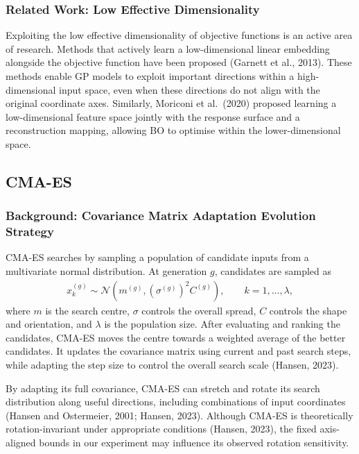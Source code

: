 \documentclass[11pt]{article}
\begin{document}
\subsubsection{Related Work: Low Effective Dimensionality}

Exploiting the low effective dimensionality of objective functions is an active area of research. Methods that actively learn a low-dimensional linear embedding alongside the objective function have been proposed (Garnett et al., 2013). These methods enable GP models to exploit important directions within a high-dimensional input space, even when these directions do not align with the original coordinate axes. Similarly, Moriconi et al.\ (2020) proposed learning a low-dimensional feature space jointly with the response surface and a reconstruction mapping, allowing BO to optimise within the lower-dimensional space.

\subsection{CMA-ES}

\subsubsection{Background: Covariance Matrix Adaptation Evolution Strategy}

CMA-ES searches by sampling a population of candidate inputs from a multivariate normal distribution. At generation $g$, candidates are sampled as
\begin{align}
\label{eq:cmaes}
x_k^{(g)} \sim \mathcal{N}\!\left(m^{(g)},(\sigma^{(g)})^2 C^{(g)}\right),\qquad k=1,\ldots,\lambda,
\end{align}
where $m$ is the search centre, $\sigma$ controls the overall spread, $C$ controls the shape and orientation, and $\lambda$ is the population size. After evaluating and ranking the candidates, CMA-ES moves the centre towards a weighted average of the better candidates. It updates the covariance matrix using current and past search steps, while adapting the step size to control the overall search scale (Hansen, 2023).

By adapting its full covariance, CMA-ES can stretch and rotate its search distribution along useful directions, including combinations of input coordinates (Hansen and Ostermeier, 2001; Hansen, 2023). Although CMA-ES is theoretically rotation-invariant under appropriate conditions (Hansen, 2023), the fixed axis-aligned bounds in our experiment may influence its observed rotation sensitivity.
\end{document}
